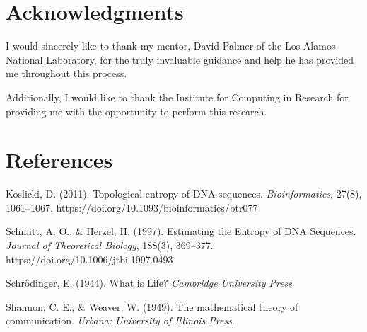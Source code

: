 \documentclass[11pt, letterpaper, twocolumn]{article}
\begin{document}
	\section{Acknowledgments}
	I would sincerely like to thank my mentor, David Palmer of the Los Alamos National Laboratory, for the truly invaluable guidance and help he has provided me throughout this process.
	
	Additionally, I would like to thank the Institute for Computing in Research for providing me with the opportunity to perform this research.
	
	\section{References}
	\begin{hangparas}{.25in}{1}
		Koslicki, D. (2011). Topological entropy of DNA sequences. \emph{Bioinformatics}, 27(8), 1061–1067. https://doi.org/10.1093/bioinformatics/btr077 
		
		Schmitt, A. O., \& Herzel, H. (1997). Estimating the Entropy of DNA Sequences. \emph{Journal of Theoretical Biology}, 188(3), 369–377. https://doi.org/10.1006/jtbi.1997.0493 
		
		Schrödinger, E. (1944). What is Life? \emph{Cambridge University Press}
		
		Shannon, C. E., \& Weaver, W. (1949). The mathematical theory of communication. \emph{Urbana: University of Illinois Press}.
	\end{hangparas}
	
\end{document}
